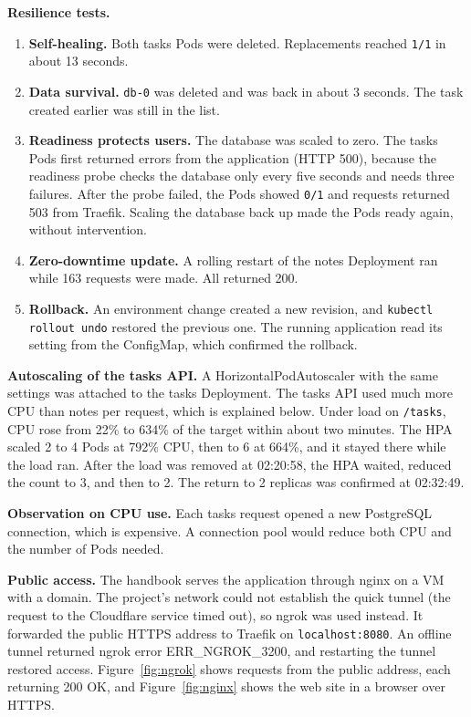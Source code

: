 \documentclass[11pt,a4paper]{article}
\begin{document}
\textbf{Resilience tests.}
\begin{enumerate}[leftmargin=*]
  \item \textbf{Self-healing.} Both tasks Pods were deleted. Replacements reached \texttt{1/1} in about 13 seconds.
  \item \textbf{Data survival.} \texttt{db-0} was deleted and was back in about 3 seconds. The task created earlier was still in the list.
  \item \textbf{Readiness protects users.} The database was scaled to zero. The tasks Pods first returned errors from the application (HTTP 500), because the readiness probe checks the database only every five seconds and needs three failures. After the probe failed, the Pods showed \texttt{0/1} and requests returned 503 from Traefik. Scaling the database back up made the Pods ready again, without intervention.
  \item \textbf{Zero-downtime update.} A rolling restart of the notes Deployment ran while 163 requests were made. All returned 200.
  \item \textbf{Rollback.} An environment change created a new revision, and \texttt{kubectl rollout undo} restored the previous one. The running application read its setting from the ConfigMap, which confirmed the rollback.
\end{enumerate}

\textbf{Autoscaling of the tasks API.} A HorizontalPodAutoscaler with the same settings was attached to the tasks Deployment. The tasks API used much more CPU than notes per request, which is explained below. Under load on \texttt{/tasks}, CPU rose from 22\% to 634\% of the target within about two minutes. The HPA scaled 2 to 4 Pods at 792\% CPU, then to 6 at 664\%, and it stayed there while the load ran. After the load was removed at 02:20:58, the HPA waited, reduced the count to 3, and then to 2. The return to 2 replicas was confirmed at 02:32:49.

\textbf{Observation on CPU use.} Each tasks request opened a new PostgreSQL connection, which is expensive. A connection pool would reduce both CPU and the number of Pods needed.

\textbf{Public access.} The handbook serves the application through nginx on a VM with a domain. The project's network could not establish the quick tunnel (the request to the Cloudflare service timed out), so ngrok was used instead. It forwarded the public HTTPS address to Traefik on \texttt{localhost:8080}. An offline tunnel returned ngrok error ERR\_NGROK\_3200, and restarting the tunnel restored access. Figure~\ref{fig:ngrok} shows requests from the public address, each returning 200 OK, and Figure~\ref{fig:nginx} shows the web site in a browser over HTTPS.
\end{document}

